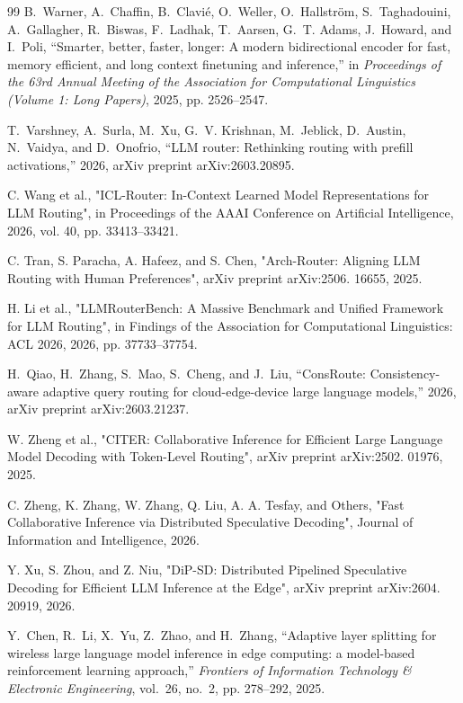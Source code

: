 \documentclass[lettersize,journal]{IEEEtran}
\begin{document}
\begin{thebibliography}{99}
B.~Warner, A.~Chaffin, B.~Clavi{\'e}, O.~Weller, O.~Hallstr{\"o}m,
  S.~Taghadouini, A.~Gallagher, R.~Biswas, F.~Ladhak, T.~Aarsen, G.~T. Adams,
  J.~Howard, and I.~Poli, ``Smarter, better, faster, longer: A modern
  bidirectional encoder for fast, memory efficient, and long context finetuning
  and inference,'' in \emph{Proceedings of the 63rd Annual Meeting of the
  Association for Computational Linguistics (Volume 1: Long Papers)}, 2025, pp.
  2526--2547.

T.~Varshney, A.~Surla, M.~Xu, G.~V. Krishnan, M.~Jeblick, D.~Austin, N.~Vaidya,
  and D.~Onofrio, ``{LLM} router: Rethinking routing with prefill
  activations,'' 2026, arXiv preprint arXiv:2603.20895.

C. Wang et al., "ICL-Router: In-Context Learned Model Representations for LLM Routing", in Proceedings of the AAAI Conference on Artificial Intelligence, 2026, vol. 40, pp. 33413–33421.

C. Tran, S. Paracha, A. Hafeez, and S. Chen, "Arch-Router: Aligning LLM Routing with Human Preferences", arXiv preprint arXiv:2506. 16655, 2025.

H. Li et al., "LLMRouterBench: A Massive Benchmark and Unified Framework for LLM Routing", in Findings of the Association for Computational Linguistics: ACL 2026, 2026, pp. 37733–37754.

H.~Qiao, H.~Zhang, S.~Mao, S.~Cheng, and J.~Liu, ``{ConsRoute}:
  Consistency-aware adaptive query routing for cloud-edge-device large language
  models,'' 2026, arXiv preprint arXiv:2603.21237.

W. Zheng et al., "CITER: Collaborative Inference for Efficient Large Language Model Decoding with Token-Level Routing", arXiv preprint arXiv:2502. 01976, 2025.

C. Zheng, K. Zhang, W. Zhang, Q. Liu, A. A. Tesfay, and Others, "Fast Collaborative Inference via Distributed Speculative Decoding", Journal of Information and Intelligence, 2026.

Y. Xu, S. Zhou, and Z. Niu, "DiP-SD: Distributed Pipelined Speculative Decoding for Efficient LLM Inference at the Edge", arXiv preprint arXiv:2604. 20919, 2026.

Y.~Chen, R.~Li, X.~Yu, Z.~Zhao, and H.~Zhang, ``Adaptive layer splitting for
  wireless large language model inference in edge computing: a model-based
  reinforcement learning approach,'' \emph{Frontiers of Information Technology
  \& Electronic Engineering}, vol.~26, no.~2, pp. 278--292, 2025.


\end{thebibliography}
\end{document}
